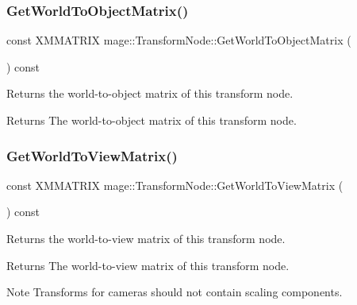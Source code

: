 \subsubsection{\texorpdfstring{Get\+World\+To\+Object\+Matrix()}{GetWorldToObjectMatrix()}}
{\footnotesize\ttfamily const X\+M\+M\+A\+T\+R\+IX mage\+::\+Transform\+Node\+::\+Get\+World\+To\+Object\+Matrix (\begin{DoxyParamCaption}{ }\end{DoxyParamCaption}) const\hspace{0.3cm}{\ttfamily [noexcept]}}

Returns the world-\/to-\/object matrix of this transform node.

\begin{DoxyReturn}{Returns}
The world-\/to-\/object matrix of this transform node. 
\end{DoxyReturn}
\hypertarget{structmage_1_1_transform_node_add9f28faa15d91a451880de4743dd439}{}\label{structmage_1_1_transform_node_add9f28faa15d91a451880de4743dd439} 
\subsubsection{\texorpdfstring{Get\+World\+To\+View\+Matrix()}{GetWorldToViewMatrix()}}
{\footnotesize\ttfamily const X\+M\+M\+A\+T\+R\+IX mage\+::\+Transform\+Node\+::\+Get\+World\+To\+View\+Matrix (\begin{DoxyParamCaption}{ }\end{DoxyParamCaption}) const\hspace{0.3cm}{\ttfamily [noexcept]}}

Returns the world-\/to-\/view matrix of this transform node.

\begin{DoxyReturn}{Returns}
The world-\/to-\/view matrix of this transform node. 
\end{DoxyReturn}
\begin{DoxyNote}{Note}
Transforms for cameras should not contain scaling components. 
\end{DoxyNote}
\hypertarget{structmage_1_1_transform_node_a9d545f02c9d8062a29b236a94c8c2136}{}\label{structmage_1_1_transform_node_a9d545f02c9d8062a29b236a94c8c2136} 
